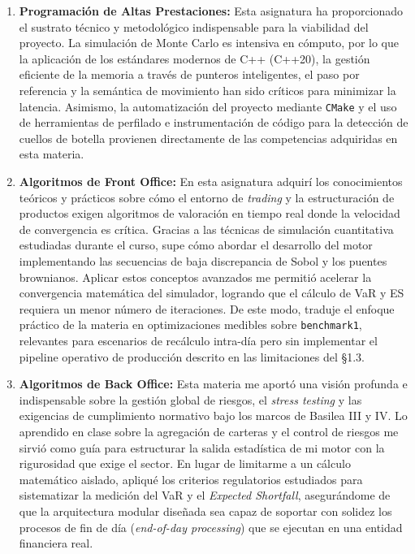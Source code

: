 \documentclass[11pt]{article}
\begin{document}
\begin{enumerate}
    \item \textbf{Programación de Altas Prestaciones:}
    Esta asignatura ha proporcionado el sustrato técnico y metodológico indispensable para la viabilidad del proyecto. La simulación de Monte Carlo es intensiva en cómputo, por lo que la aplicación de los estándares modernos de C++ (C++20), la gestión eficiente de la memoria a través de punteros inteligentes, el paso por referencia y la semántica de movimiento han sido críticos para minimizar la latencia. Asimismo, la automatización del proyecto mediante \texttt{CMake} y el uso de herramientas de perfilado e instrumentación de código para la detección de cuellos de botella provienen directamente de las competencias adquiridas en esta materia.

    \item \textbf{Algoritmos de Front Office:}
    En esta asignatura adquirí los conocimientos teóricos y prácticos sobre cómo el entorno de \textit{trading} y la estructuración de productos exigen algoritmos de valoración en tiempo real donde la velocidad de convergencia es crítica. Gracias a las técnicas de simulación cuantitativa estudiadas durante el curso, supe cómo abordar el desarrollo del motor implementando las secuencias de baja discrepancia de Sobol y los puentes brownianos. Aplicar estos conceptos avanzados me permitió acelerar la convergencia matemática del simulador, logrando que el cálculo de VaR y ES requiera un menor número de iteraciones. De este modo, traduje el enfoque práctico de la materia en optimizaciones medibles sobre \texttt{benchmark1}, relevantes para escenarios de recálculo intra-día pero sin implementar el pipeline operativo de producción descrito en las limitaciones del §1.3.


    \item \textbf{Algoritmos de Back Office:}
    Esta materia me aportó una visión profunda e indispensable sobre la gestión global de riesgos, el \textit{stress testing} y las exigencias de cumplimiento normativo bajo los marcos de Basilea III y IV. Lo aprendido en clase sobre la agregación de carteras y el control de riesgos me sirvió como guía para estructurar la salida estadística de mi motor con la rigurosidad que exige el sector. En lugar de limitarme a un cálculo matemático aislado, apliqué los criterios regulatorios estudiados para sistematizar la medición del VaR y el \textit{Expected Shortfall}, asegurándome de que la arquitectura modular diseñada sea capaz de soportar con solidez los procesos de fin de día (\textit{end-of-day processing}) que se ejecutan en una entidad financiera real.


\end{enumerate}
\end{document}
